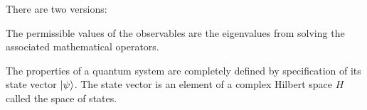 \documentclass{school-22.101-notes}
\date{September 12, 2011}
\begin{document}
\maketitle


\begin{axiom} There are two versions:
  \begin{subaxiom}
    The permissible values of the observables are the eigenvalues from solving the associated mathematical operators.
  \end{subaxiom}
  \begin{subaxiom}
    The properties of a quantum system are completely defined by specification of its state vector $\left| \psi \right>$. The state vector is an element of a complex Hilbert space $H$ called the space of states. 
  \end{subaxiom}
\end{axiom}
\end{document}
